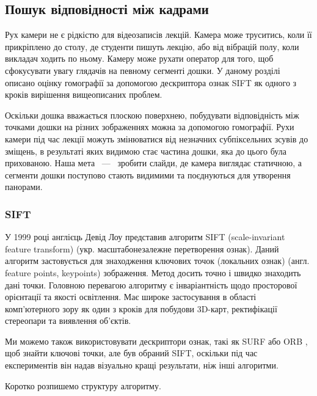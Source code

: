 \subsection{Пошук відповідності між кадрами}

Рух камери не є рідкістю для відеозаписів лекцій. Камера може труситись,
коли її прикріплено до столу, де студенти пишуть лекцію, або від
вібрацій полу, коли викладач ходить по ньому. Камеру може рухати
оператор для того, щоб сфокусувати увагу глядачів на певному сегменті
дошки. У даному розділі описано оцінку гомографії за допомогою
дескриптора ознак SIFT як одного з кроків вирішення вищеописаних
проблем.

Оскільки дошка вважається плоскою поверхнею, побудувати відповідність
між точками дошки на різних зображеннях можна за допомогою гомографії.
Рухи камери під час лекції можуть змінюватися від незначних
субпіксельних зсувів до зміщень, в результаті яких видимою стає частина
дошки, яка до цього була прихованою. Наша мета ~---~ зробити слайди, де
камера виглядає статичною, а сегменти дошки поступово стають видимими та
поєднуються для утворення панорами.

\subsubsection{SIFT}

У 1999 році англієць Девід Лоу представив алгоритм SIFT (scale-invariant feature transform)
\cite{sift} (укр. масштабонезалежне перетворення ознак). Даний алгоритм
застовується для знаходження ключових точок (локальних ознак) (англ. feature points, keypoints) зображення.
Метод досить точно і швидко знаходить дані точки.
Головною перевагою алгоритму є інваріантність щодо просторової орієнтації та якості освітлення.
Має широке застосування в області комп'ютерного зору як один з кроків для побудови 3D-карт,
ректифікації стереопари та виявлення об'єктів.

Ми можемо також використовувати дескриптори ознак, такі як SURF \cite{surf} або ORB \cite{orb},
щоб знайти ключові точки, але був обраний SIFT,
оскільки під час експериментів він надав візуально кращі результати, ніж
інші алгоритми.

Коротко розпишемо структуру алгоритму.

